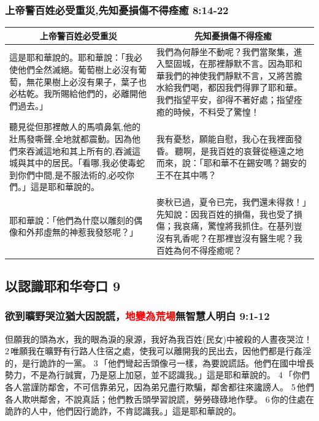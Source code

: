 \subsubsection{上帝警百姓必受重災,先知憂損傷不得痊癒 8:14-22}
\begin{table}[H]
\centering
\begin{tabular}{p{7.75cm}|p{9.50cm}}\hline\hline
\multicolumn{1}{c|}{上帝警百姓必受重災}&\multicolumn{1}{c}{先知憂損傷不得痊癒}\\\hline
這是耶和華說的。耶和華說：「我必使他們全然滅絕。葡萄樹上必沒有葡萄，無花果樹上必沒有果子，葉子也必枯乾。我所賜給他們的，必離開他們過去。」 
&我們為何靜坐不動呢？我們當聚集，進入堅固城，在那裡靜默不言。因為耶和華我們的神使我們靜默不言，又將苦膽水給我們喝，都因我們得罪了耶和華。我們指望平安，卻得不著好處；指望痊癒的時候，不料受了驚惶！\\\hline
聽見從但那裡敵人的馬噴鼻氣,他的壯馬發嘶聲,全地就都震動。因為他們來吞滅這地和其上所有的,吞滅這城與其中的居民。「看哪,我必使毒蛇到你們中間,是不服法術的,必咬你們。」這是耶和華說的。
&我有憂愁，願能自慰，我心在我裡面發昏。 聽啊，是我百姓的哀聲從極遠之地而來，說：「耶和華不在錫安嗎？錫安的王不在其中嗎？ \\\hline
耶和華說：「他們為什麼以雕刻的偶像和外邦虛無的神惹我發怒呢？」 &麥秋已過，夏令已完，我們還未得救！」先知說：因我百姓的損傷，我也受了損傷；我哀痛，驚惶將我抓住。在基列豈沒有乳香呢？在那裡豈沒有醫生呢？我百姓為何不得痊癒呢？\\\hline
\end{tabular}
\end{table}



\subsection{以認識耶和华夸口 9}
\subsubsection{欲到曠野哭泣猶大因說謊，\textcolor{red}{地變為荒場}無智慧人明白 9:1-12}
但願我的頭為水，我的眼為淚的泉源，我好為我百姓(民女)中被殺的人晝夜哭泣！ 2 唯願我在曠野有行路人住宿之處，使我可以離開我的民出去，因他們都是行姦淫的，是行詭詐的一黨。 3 「他們彎起舌頭像弓一樣，為要說謊話。他們在國中增長勢力，不是為行誠實，乃是惡上加惡，並不認識我。」這是耶和華說的。 4 「你們各人當謹防鄰舍，不可信靠弟兄，因為弟兄盡行欺騙，鄰舍都往來讒謗人。 5 他們各人欺哄鄰舍，不說真話；他們教舌頭學習說謊，勞勞碌碌地作孽。 6 你的住處在詭詐的人中，他們因行詭詐，不肯認識我。」這是耶和華說的。

